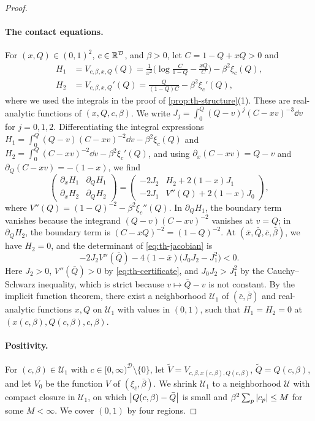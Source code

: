 \begin{proof}
\paragraph{The contact equations.}
For $(x,Q)\in(0,1)^2$, $c\in\mathbb R^{\mathcal D}$, and $\beta>0$, let $C=1-Q+xQ>0$ and
\[
\begin{aligned}
H_1&=V_{c,\beta,x,Q}(Q)=\frac1{x^2}\Big(\log\frac C{1-Q}-\frac{xQ}C\Big)-\beta^2\xi_c(Q),\\
H_2&=V_{c,\beta,x,Q}'(Q)=\frac Q{(1-Q)C}-\beta^2\xi_c'(Q),
\end{aligned}
\]
where we used the integrals in the proof of \cref{prop:th-structure}(1). These are real-analytic functions of $(x,Q,c,\beta)$. We write $J_j=\int_0^Q(Q-v)^j(C-xv)^{-3}\dd v$ for $j=0,1,2$. Differentiating the integral expressions $H_1=\int_0^Q(Q-v)(C-xv)^{-2}\dd v-\beta^2\xi_c(Q)$ and $H_2=\int_0^Q(C-xv)^{-2}\dd v-\beta^2\xi_c'(Q)$, and using $\partial_x(C-xv)=Q-v$ and $\partial_Q(C-xv)=-(1-x)$, we find
\begin{equation}\label{eq:th-jacobian}
\begin{pmatrix}\partial_xH_1&\partial_QH_1\\\partial_xH_2&\partial_QH_2\end{pmatrix}=\begin{pmatrix}-2J_2&H_2+2(1-x)J_1\\-2J_1&V''(Q)+2(1-x)J_0\end{pmatrix},
\end{equation}
where $V''(Q)=(1-Q)^{-2}-\beta^2\xi_c''(Q)$. In $\partial_QH_1$, the boundary term vanishes because the integrand $(Q-v)(C-xv)^{-2}$ vanishes at $v=Q$; in $\partial_QH_2$, the boundary term is $(C-xQ)^{-2}=(1-Q)^{-2}$. At $(\bar x,\bar Q,\bar c,\bar\beta)$, we have $H_2=0$, and the determinant of \eqref{eq:th-jacobian} is
\[
-2J_2V''(\bar Q)-4(1-\bar x)\big(J_0J_2-J_1^2\big)<0.
\]
Here $J_2>0$, $V''(\bar Q)>0$ by \eqref{eq:th-certificate}, and $J_0J_2>J_1^2$ by the Cauchy--Schwarz inequality, which is strict because $v\mapsto \bar Q-v$ is not constant. By the implicit function theorem, there exist a neighborhood $\mathcal U_1$ of $(\bar c,\bar\beta)$ and real-analytic functions $x,Q$ on $\mathcal U_1$ with values in $(0,1)$, such that $H_1=H_2=0$ at $(x(c,\beta),Q(c,\beta),c,\beta)$.

\paragraph{Positivity.}
For $(c,\beta)\in\mathcal U_1$ with $c\in[0,\infty)^{\mathcal D}\setminus\{0\}$, let $\tilde V=V_{c,\beta,x(c,\beta),Q(c,\beta)}$, $\tilde Q=Q(c,\beta)$, and let $V_0$ be the function $V$ of $(\xi_{\bar c},\bar\beta)$. We shrink $\mathcal U_1$ to a neighborhood $\mathcal U$ with compact closure in $\mathcal U_1$, on which $\left|Q(c,\beta)-\bar Q\right|$ is small and $\beta^2\sum_p\left|c_p\right|\le M$ for some $M<\infty$. We cover $(0,1)$ by four regions.


\end{proof}
